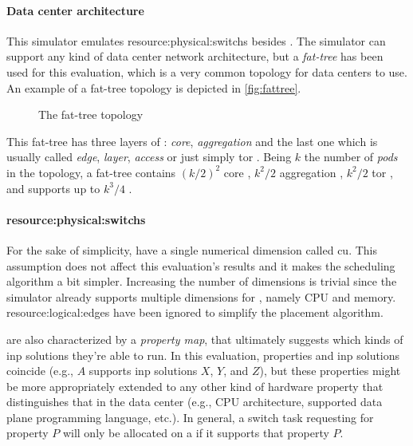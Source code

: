 \paragraph{Data center architecture}
This simulator emulates \glspl{resource:physical:switch} besides .
The simulator can support any kind of data center network architecture, but a \textit{fat-tree} has been used for this evaluation, which is a very common topology for data centers to use. An example of a fat-tree topology is depicted in \autoref{fig:fattree}.
\begin{figure}[!htb]
    \centering
    \usebox{\fattree}
    \caption{The fat-tree topology}
    \label{fig:fattree}
\end{figure}

This fat-tree has three layers of : \textit{core}, \textit{aggregation} and the last one which is usually called \textit{edge}, \textit{layer}, \textit{access} or just simply \gls{tor} .
Being $k$ the number of \textit{pods} in the topology, a fat-tree contains $(k/2)^2$ core , $k^2/2$ aggregation , $k^2/2$ \gls{tor} , and supports up to $k^3/4$ .

\paragraph{\Glspl{resource:physical:switch}} \label{simulator_switch_resources}
For the sake of simplicity,  have a single numerical dimension called \gls{cu}.
This assumption does not affect this evaluation's results and it makes the scheduling algorithm a bit simpler.
Increasing the number of  dimensions is trivial since the simulator already supports multiple dimensions for , namely CPU and memory.
\Glspl{resource:logical:edge} have been ignored to simplify the placement algorithm.

 are also characterized by a \textit{property map}, that ultimately suggests which kinds of \gls{inp} solutions they're able to run.
In this evaluation, properties and \gls{inp} solutions coincide (e.g.,  $A$ supports \gls{inp} solutions $X$, $Y$, and $Z$), but these properties might be more appropriately extended to any other kind of hardware property that distinguishes that  in the data center (e.g., CPU architecture, supported data plane programming language, etc.).
In general, a switch task requesting for property $P$ will only be allocated on a  if it supports that property $P$.